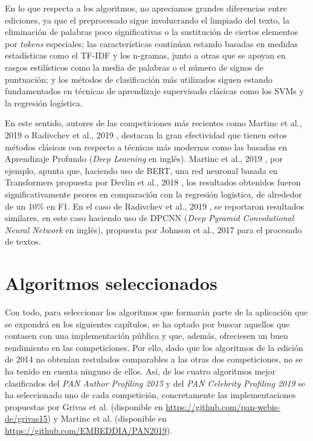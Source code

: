 \bigskip
En lo que respecta a los algoritmos, no apreciamos grandes diferencias entre ediciones, ya que el preprocesado sigue involucrando
el limpiado del texto, la eliminación de palabras poco significativas o la sustitución de ciertos elementos por \textit{tokens} especiales;
las características continúan estando basadas en medidas estadísticas como el TF-IDF y los n-gramas, junto
a otras que se apoyan en rasgos estilísticos como la media de palabras o el número de signos de puntuación; y los métodos de clasificación más utilizados
siguen estando fundamentados en técnicas de aprendizaje supervisado clásicas como los SVMs y la regresión logística.

\bigskip
En este sentido, autores de las competiciones más recientes como Martinc et al., 2019 \cite{martinc2019hot} o Radivchev et al., 2019 \cite{radivchev2019celebrity}, destacan
la gran efectividad que tienen estos métodos clásicos
con respecto a técnicas más modernas como las basadas en Aprendizaje Profundo (\textit{Deep Learning} en inglés). Martinc et al., 2019 \cite{martinc2019hot}, por ejemplo,
apunta que, haciendo uso de BERT, una red neuronal basada en Transformers propuesta por Devlin et al., 2018 \cite{devlin2018bert},
los resultados obtenidos fueron significativamente peores en comparación con la regresión logistica, de alrededor de un 10\% en F1. En el caso
de Radivchev et al., 2019 \cite{radivchev2019celebrity}, se reportaron resultados similares, en este caso haciendo uso de DPCNN (\textit{Deep Pyramid Convolutional Neural Network} en inglés),
propuesta por Johnson et al., 2017 \cite{johnson2017deep} para el procesado de textos.

\section{Algoritmos seleccionados}
\label{sec:algoritmos_seleccionados}

Con todo, para seleccionar los algoritmos que formarán parte de la aplicación que se expondrá en los siguientes capítulos, se ha optado
por buscar aquellos que contasen con una implementación pública y que, además, ofreciesen un buen rendimiento en las competiciones.
Por ello, dado que los algoritmos de la edición de 2014 no obtenían restulados comparables a las otras dos competiciones,
no se ha tenido en cuenta ninguno de ellos. Así, de los cuatro algoritmos mejor clasificados del \textit{PAN Author Profiling 2015} y
del \textit{PAN Celebrity Profiling 2019} se ha seleccionado uno de cada competición, concretamente las implementaciones propuestas por
Grivas et al. \cite{grivas2015author} (disponible en \url{https://github.com/pan-webis-de/grivas15})
y Martinc et al. \cite{martinc2019hot} (disponible en \url{https://github.com/EMBEDDIA/PAN2019}).

